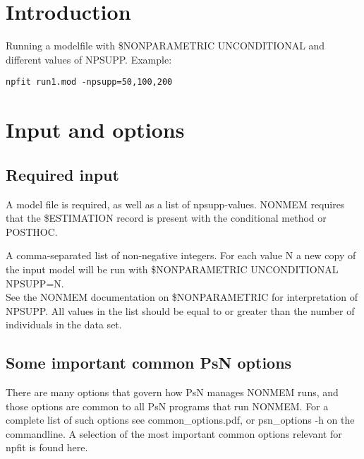 

\newcommand{\guidetoolname}{npfit}



\maketitle


\section{Introduction}
Running a modelfile with \$NONPARAMETRIC UNCONDITIONAL and different values of NPSUPP.
Example:
\begin{verbatim}
npfit run1.mod -npsupp=50,100,200
\end{verbatim}

\section{Input and options}

\subsection{Required input}
A model file is required, as well as a list of npsupp-values. NONMEM requires that the \$ESTIMATION record is present with the conditional method or POSTHOC.
\begin{optionlist}
A comma-separated list of non-negative integers. For each value N a new copy of the input model will be run with \$NONPARAMETRIC UNCONDITIONAL NPSUPP=N.\\ See the NONMEM documentation on \$NONPARAMETRIC for interpretation of NPSUPP.
All values in the list should be equal to or greater than the number of individuals in the data set.
\nextopt
\end{optionlist}





\subsection{Some important common PsN options}
There are many options that govern how PsN manages NONMEM runs, and
those options are common to all PsN programs that run NONMEM.
For a complete list of such options see common\_options.pdf, 
or psn\_options -h on the commandline. A selection of
the most important common options relevant for npfit is found here.


